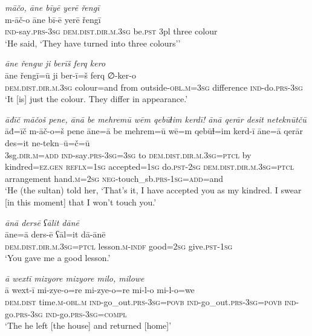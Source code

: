 \ea \label{ŽH.89}
\textit{māčo, āne bīyē yerē řengī} \\ 
\gll m-āč-o āne bī-ē yerē řengī \\ 
 \textsc{ind-}say\textsc{.prs}\textsc{-3sg} \textsc{dem.dist}\textsc{.dir}\textsc{.m}\textsc{.3sg} be\textsc{.pst} 3pl three colour \\ 
\glt `He said, ‘They have turned into three colours’'
\z 
 
\ea \label{ŽH.100}
\textit{āne řengw ji berīš ferq kero} \\ 
\gll āne řengī=ū ji ber-ī=š ferq ∅-ker-o \\ 
 \textsc{dem.dist}\textsc{.dir}\textsc{.m}\textsc{.3sg} colour=and from outside\textsc{-obl}\textsc{.m}\textsc{=3sg} difference \textsc{ind-}do\textsc{.prs}\textsc{-3sg} \\ 
\glt `It [is] just the colour. They differ in appearance.'
\z 
 
\ea \label{ŽH.103}
\textit{āđīč māčoš pene, ānā be mehremū wēm qebūɫim kerdī! ānā qerār desit neteknūtčū} \\ 
\gll āđ=īč m-āč-o=š pene āne=ā be mehrem=ū wē=m qebūɫ=im kerd-ī āne=ā qerār des=it ne-tekn--ū=č=ū \\ 
 3sg\textsc{.dir}\textsc{.m}\textsc{=add} \textsc{ind-}say\textsc{.prs}\textsc{-3sg}\textsc{=3sg} to \textsc{dem.dist}\textsc{.dir}\textsc{.m}\textsc{.3sg}=\textsc{ptcl} by kindred\textsc{=ez}\textsc{.gen} \textsc{reflx}\textsc{=1sg} accepted\textsc{=1sg} do\textsc{.pst}-\textsc{2sg} \textsc{dem.dist}\textsc{.dir}\textsc{.m}\textsc{.3sg}=\textsc{ptcl} arrangement hand\textsc{.m}\textsc{=\textsc{2sg}} \textsc{neg-}touch\_sb\textsc{.prs}\textsc{-1sg}\textsc{=add}=and \\ 
\glt `He (the sultan) told her, ‘That’s it, I have accepted you as my kindred. I swear [in this moment] that I won’t touch you.'
\z 
 
\ea \label{ŽH.104}
\textit{ānā dersē ʕālit dānē} \\ 
\gll āne=ā ders-ē ʕāl=it dā-ānē \\ 
 \textsc{dem.dist}\textsc{.dir}\textsc{.m}\textsc{.3sg}=\textsc{ptcl} lesson\textsc{.m}\textsc{-indf} good\textsc{=\textsc{2sg}} give\textsc{.pst}\textsc{-1sg} \\ 
\glt `You gave me a good lesson.'
\z 
 
\ea \label{ŽH.106}
\textit{ā wextī mizyore mizyore milo, milowe} \\ 
\gll ā wext-ī mi-zye-o=re mi-zye-o=re mi-l-o mi-l-o=we \\ 
 \textsc{dem.dist} time\textsc{.m}\textsc{-obl}\textsc{.m} \textsc{ind-}go\_out\textsc{.prs}\textsc{-3sg}\textsc{=\textsc{povb}} \textsc{ind-}go\_out\textsc{.prs}\textsc{-3sg}\textsc{=\textsc{povb}} \textsc{ind-}go\textsc{.prs}\textsc{-3sg} \textsc{ind-}go\textsc{.prs}\textsc{-3sg}\textsc{=compl} \\ 
\glt `The he left [the house] and returned [home]'
\z 
 
